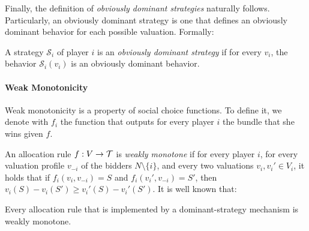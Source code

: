 Finally, the definition of \emph{obviously dominant strategies} naturally follows.  Particularly, an obviously dominant strategy is one that defines an obviously dominant behavior for each possible valuation.  Formally:
\begin{definition}
A strategy $\mathcal{S}_i$ of player $i$ is an \emph{obviously dominant strategy} if for every $v_i$, the behavior $\mathcal S_i(v_i)$ is an obviously dominant behavior.
\end{definition}
 

\paragraph{Weak Monotonicity}
Weak monotonicity is a property of social choice functions.  To define it, we denote with $f_i$ the function that outputs for every player $i$ the bundle that she wins given $f$.

    An allocation rule $f:V\to\mathcal{T}$ is \emph{weakly monotone} if for every player $i$, for every valuation profile $v_{-i}$ of the bidders $N\setminus \{i\}$, and every two valuations $v_i,v_i'\in V_i$, it holds that if $f_i(v_i,v_{-i})=S$ and $f_i(v_i',v_{-i})=S'$, then $v_i(S)-v_i(S')\ge v_i'(S)-v_i'(S')$. 
    It is well known that:
\begin{lemma}\cite{BCLMNS06,LMN03}\label{wmon-lemma}
    Every allocation rule that is implemented by a dominant-strategy mechanism is weakly monotone. 
\end{lemma}


